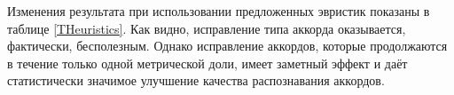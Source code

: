 Изменения результата при использовании предложенных эвристик показаны в таблице
\ref{THeuristics}. Как видно, исправление типа аккорда оказывается, фактически,
бесполезным. Однако исправление аккордов, которые продолжаются в течение только
одной метрической доли, имеет заметный эффект и даёт статистически значимое
улучшение качества распознавания аккордов.


% 
% 
% 

